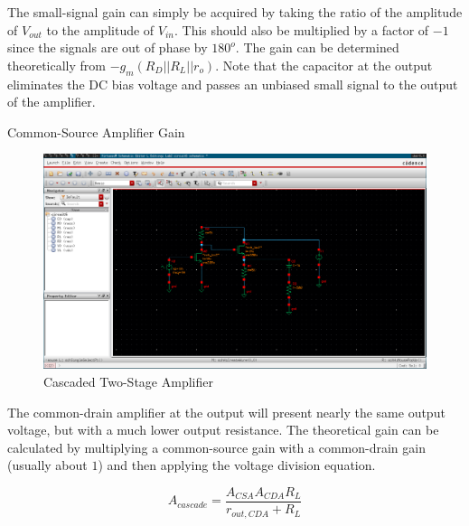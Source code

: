\FloatBarrier

The small-signal gain can simply be acquired by taking the ratio of the amplitude of $V_{out}$ to the amplitude of $V_{in}$. This should also be multiplied by a factor of $-1$ since the signals are out of phase by $180^{o}$.
The gain can be determined theoretically from $-g_{m} ( R_{D} || R_{L} || r_{o} )$.
Note that the capacitor at the output eliminates the DC bias voltage and passes an unbiased small signal to the output of the amplifier.


\FloatBarrier

\begin{table}[h!]
	\centering
	\caption{Common-Source Amplifier Gain}
	\label{tab:common_source_amp_gain}
\end{table}

\FloatBarrier


\FloatBarrier

\begin{figure}[h!]
	\centering
	\includegraphics[scale=0.30]{./images/circuit6.PNG}
	\caption{Cascaded Two-Stage Amplifier}
	\label{fig:circuit6}
\end{figure}

\FloatBarrier

The common-drain amplifier at the output will present nearly the same output voltage, but with a much lower output resistance.
The theoretical gain can be calculated by multiplying a common-source gain with a common-drain gain (usually about $1$) and then applying the voltage division equation.

\begin{equation}
	\label{eq:theoretical_cascaded_gain}
	A_{cascade} = \frac{ A_{CSA} A_{CDA} R_{L} }{ r_{out,CDA} + R_{L} }
\end{equation}

